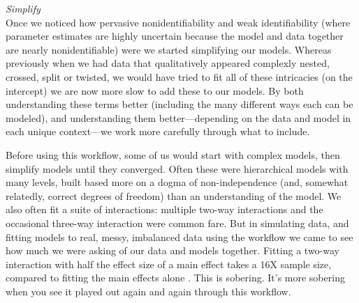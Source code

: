 \documentclass[11pt]{article}
\begin{document}
{ \emph{Simplify} \\
Once we noticed how pervasive nonidentifiability and weak identifiability (where parameter estimates are highly uncertain because the model and data together are nearly nonidentifiable) were we started simplifying our models. Whereas previously when we had data that qualitatively appeared complexly nested, crossed, split or twisted, we would have tried to fit all of these intricacies (on the intercept) we are now more slow to add these to our models. By both understanding these terms better (including the many different ways each can be modeled), and understanding them better---depending on the data and model in each unique context---we work more carefully through what to include. %

Before using this workflow, some of us would start with complex models, then simplify models until they converged. Often these were hierarchical models with many levels, built based more on a dogma of non-independence (and, somewhat relatedly, correct degrees of freedom) than an understanding of the model. We also often fit a suite of interactions: multiple two-way interactions and the occasional three-way interaction were common fare. But in simulating data, and fitting models to real, messy, imbalanced data using the workflow we came to see how much we were asking of our data and models together. Fitting a two-way interaction with half the effect size of a main effect takes a 16X sample size, compared to fitting the main effects alone \citep[which then average over the interactions][]{regotherstories}. This is sobering. It's more sobering when you see it played out again and again through this workflow. %

}
\end{document}
